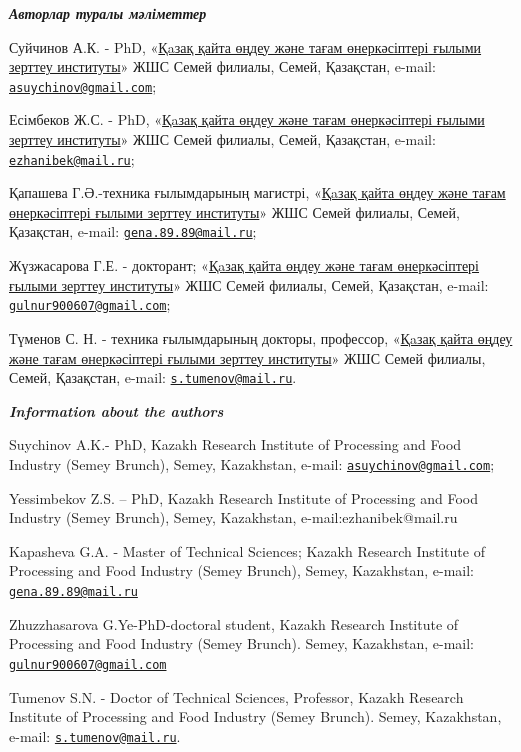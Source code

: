 \begin{authorinfo}
\emph{{\bfseries Авторлар туралы мәліметтер}}

Суйчинов А.К. - PhD, «\href{https://rpf.kz/?lang=kk}{Қaзақ қайта өңдеу
және тағам өнеркәсіптері ғылыми зерттеу институты}» ЖШС Семей филиалы,
Семей, Қазақстан, e-mail:
\href{mailto:asuychinov@gmail.com}{\nolinkurl{asuychinov@gmail.com}};

Есімбеков Ж.С. - PhD, «\href{https://rpf.kz/?lang=kk}{Қaзақ қайта өңдеу
және тағам өнеркәсіптері ғылыми зерттеу институты}» ЖШС Семей филиалы,
Семей, Қазақстан, e-mail:
\href{mailto:ezhanibek@mail.ru}{\nolinkurl{ezhanibek@mail.ru}};

Қапашева Г.Ә.-техника ғылымдарының магистрі,
«\href{https://rpf.kz/?lang=kk}{Қaзақ қайта өңдеу және тағам
өнеркәсіптері ғылыми зерттеу институты}» ЖШС Семей филиалы, Семей,
Қазақстан, e-mail:
\href{mailto:gena.89.89@mail.ru}{\nolinkurl{gena.89.89@mail.ru}};

Жүзжасарова Г.Е. - докторант; «\href{https://rpf.kz/?lang=kk}{Қaзақ
қайта өңдеу және тағам өнеркәсіптері ғылыми зерттеу институты}» ЖШС
Семей филиалы, Семей, Қазақстан, e-mail:
\href{mailto:gulnur900607@gmail.com}{\nolinkurl{gulnur900607@gmail.com}};

Түменов С. Н. - техника ғылымдарының докторы, профессор,
«\href{https://rpf.kz/?lang=kk}{Қaзақ қайта өңдеу және тағам
өнеркәсіптері ғылыми зерттеу институты}» ЖШС Семей филиалы, Семей,
Қазақстан, e-mail:
\href{mailto:s.tumenov@mail.ru}{\nolinkurl{s.tumenov@mail.ru}}.

\emph{{\bfseries Information about the authors}}

Suychinov A.K.- PhD, Kazakh Research Institute of Processing and Food
Industry (Semey Brunch), Semey, Kazakhstan, e-mail:
\href{mailto:asuychinov@gmail.com}{\nolinkurl{asuychinov@gmail.com}};

Yessimbekov Z.S. -- PhD, Kazakh Research Institute of Processing and
Food Industry (Semey Brunch), Semey, Kazakhstan,
e-mail:ezhanibek@mail.ru

Kapasheva G.A. - Master of Technical Sciences; Kazakh Research Institute
of Processing and Food Industry (Semey Brunch), Semey, Kazakhstan,
e-mail: \href{mailto:gena.89.89@mail.ru}{\nolinkurl{gena.89.89@mail.ru}}

Zhuzzhasarova G.Ye-PhD-doctoral student, Kazakh Research Institute of
Processing and Food Industry (Semey Brunch). Semey, Kazakhstan, e-mail:
\href{mailto:gulnur900607@gmail.com}{\nolinkurl{gulnur900607@gmail.com}}

Tumenov S.N. - Doctor of Technical Sciences, Professor, Kazakh Research
Institute of Processing and Food Industry (Semey Brunch). Semey,
Kazakhstan, e-mail:
\href{mailto:s.tumenov@mail.ru}{\nolinkurl{s.tumenov@mail.ru}}.\
\end{authorinfo}
